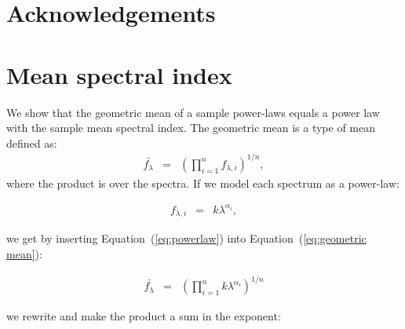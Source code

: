 \documentclass{aa}    %
\newcommand{\Eq}[1]{Equation~(\ref{eq:#1})}
\newcommand{\eq}[1]{\Eq{#1}}
\newcommand{\eqlabel}[1]{\label{eq:#1}}
\newcommand{\sectlabel}[1]{\label{sect:#1}}
\begin{document}
\section{Acknowledgements}  \sectlabel{Acknowledgements}







%
 

%
%


%





\appendix

\section{Mean spectral index}  \sectlabel{math}


We show that the geometric mean of a sample power-laws equals a power law with the sample mean spectral index. The geometric mean is a type of mean defined as:
\begin{eqnarray}\eqlabel{geometric mean}
\bar{f_{\lambda}} &=&  \left( \prod_{i=1}^n f_{\lambda, i} \right) ^{1/n},
\end{eqnarray}
where the product is over the spectra. If we model each spectrum as a power-law:

\begin{eqnarray}\eqlabel{powerlaw}
f_{\lambda, i} &=&  k \lambda ^{\alpha_{i}},
\end{eqnarray}

 we get by inserting \eq{powerlaw} into \eq{geometric mean}:
 
 \begin{eqnarray}\eqlabel{deriv1}
 \bar{f_{\lambda}} &=&  \left( \prod_{i=1}^n k \lambda ^{\alpha_{i}}\right) ^{1/n}
 \end{eqnarray}

we rewrite and make the product a sum in the exponent:
\end{document}
